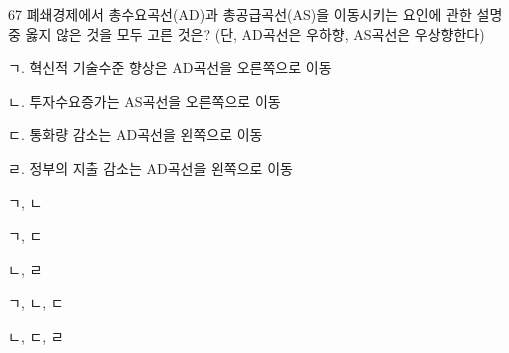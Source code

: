\begin{question}{67}
폐쇄경제에서 총수요곡선(AD)과 총공급곡선(AS)을 이동시키는 요인에 관한 설명 중 옳지 않은 것을 모두 고른 것은? (단, AD곡선은 우하향, AS곡선은 우상향한다)
\begin{framedtext}
ㄱ. 혁신적 기술수준 향상은 AD곡선을 오른쪽으로 이동 \par
ㄴ. 투자수요증가는 AS곡선을 오른쪽으로 이동 \par
ㄷ. 통화량 감소는 AD곡선을 왼쪽으로 이동 \par
ㄹ. 정부의 지출 감소는 AD곡선을 왼쪽으로 이동
\end{framedtext}
\begin{choices}
  \item ㄱ, ㄴ
  \item ㄱ, ㄷ
  \item ㄴ, ㄹ
  \item ㄱ, ㄴ, ㄷ
  \item ㄴ, ㄷ, ㄹ
\end{choices}
\end{question}
